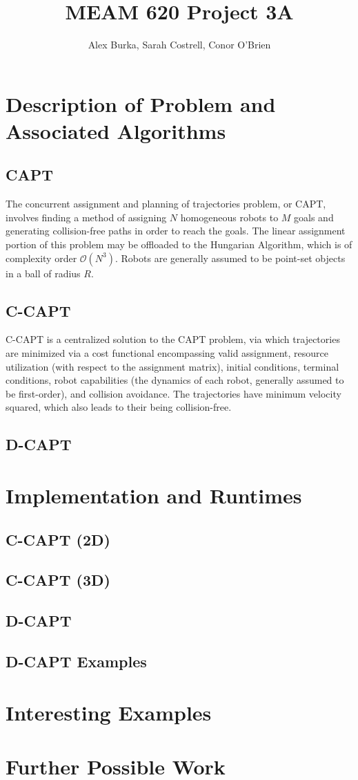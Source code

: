 \documentclass[11pt]{article}
\begin{document}
\author{Alex Burka, Sarah Costrell, Conor O'Brien}
\title{MEAM 620 Project 3A}
\maketitle

\section{Description of Problem and Associated Algorithms}

\subsection{CAPT}
The concurrent assignment and planning of trajectories problem, or CAPT, involves finding a method of assigning $N$ homogeneous robots to $M$ goals and generating collision-free paths in order to reach the goals. The linear assignment portion of this problem may be offloaded to the Hungarian Algorithm, which is of complexity order $\mathcal{O}(N^3)$. Robots are generally assumed to be point-set objects in a ball of radius $R$.

\subsection{C-CAPT}
C-CAPT is a centralized solution to the CAPT problem, via which trajectories are minimized via a cost functional encompassing valid assignment, resource utilization (with respect to the assignment matrix), initial conditions, terminal conditions, robot capabilities (the dynamics of each robot, generally assumed to be first-order), and collision avoidance. The trajectories have minimum velocity squared, which also leads to their being collision-free. \\


\subsection{D-CAPT}

\section{Implementation and Runtimes}
\subsection{C-CAPT (2D)}
\subsection{C-CAPT (3D)}
\subsection{D-CAPT}

\subsection{D-CAPT Examples}



\section{Interesting Examples}

\section{Further Possible Work}
\end{document}
